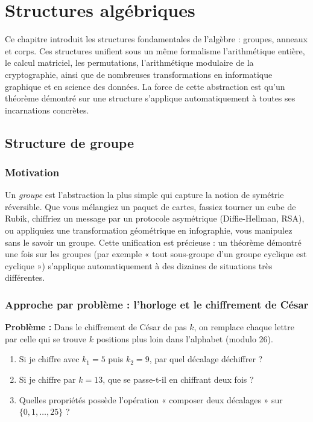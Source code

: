 \chapter{Structures algébriques}

Ce chapitre introduit les structures fondamentales de l'algèbre : groupes, anneaux et corps. Ces structures unifient sous un même formalisme l'arithmétique entière, le calcul matriciel, les permutations, l'arithmétique modulaire de la cryptographie, ainsi que de nombreuses transformations en informatique graphique et en science des données. La force de cette abstraction est qu'un théorème démontré sur une structure s'applique automatiquement à toutes ses incarnations concrètes.

\section{Structure de groupe}

\subsection{Motivation}
Un \emph{groupe} est l'abstraction la plus simple qui capture la notion de symétrie réversible. Que vous mélangiez un paquet de cartes, fassiez tourner un cube de Rubik, chiffriez un message par un protocole asymétrique (Diffie-Hellman, RSA), ou appliquiez une transformation géométrique en infographie, vous manipulez sans le savoir un groupe. Cette unification est précieuse : un théorème démontré une fois sur les groupes (par exemple « tout sous-groupe d'un groupe cyclique est cyclique ») s'applique automatiquement à des dizaines de situations très différentes.

\subsection{Approche par problème : l'horloge et le chiffrement de César}
\textbf{Problème :} Dans le chiffrement de César de pas $k$, on remplace chaque lettre par celle qui se trouve $k$ positions plus loin dans l'alphabet (modulo 26).
\begin{enumerate}
    \item Si je chiffre avec $k_1 = 5$ puis $k_2 = 9$, par quel décalage déchiffrer ?
    \item Si je chiffre par $k = 13$, que se passe-t-il en chiffrant deux fois ?
    \item Quelles propriétés possède l'opération « composer deux décalages » sur $\{0, 1, \dots, 25\}$ ?
\end{enumerate}


